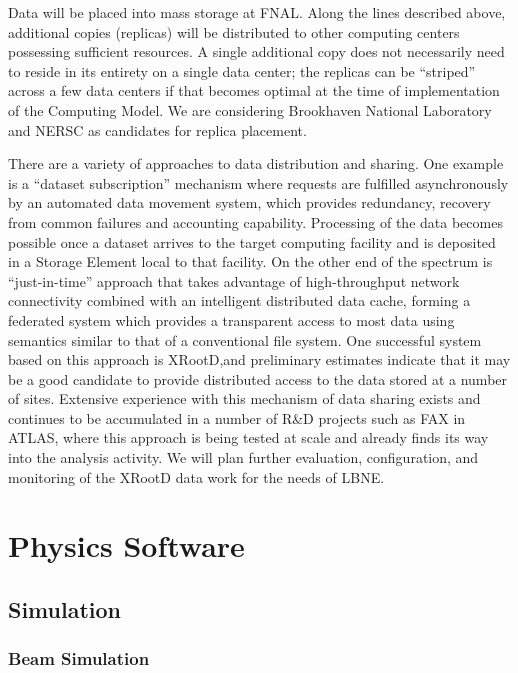 Data will be placed into mass storage at FNAL. Along the lines described above, additional copies (replicas) will be distributed to other
computing centers possessing sufficient resources.
A single additional copy does not necessarily need to reside in its entirety on a single data center; the replicas can be ``striped'' across a few data centers if that becomes optimal
at the time of implementation of the Computing Model. We are considering Brookhaven National Laboratory and NERSC as candidates for replica placement.

There are a variety of approaches to data distribution and sharing. One example is a ``dataset subscription''  mechanism where requests are fulfilled asynchronously by an automated data movement system, which provides redundancy, recovery from common failures and accounting capability. Processing of the data becomes possible once a dataset arrives to the target computing facility and is deposited in a Storage Element local to that facility.
On the other end of the spectrum is ``just-in-time'' approach that takes advantage of high-throughput network connectivity combined with an intelligent distributed data cache, forming a federated system which provides a 
transparent access to most data using semantics similar to that of a conventional file system. One successful system based on this approach is XRootD,and preliminary estimates indicate that it may be a good candidate to provide distributed access to the data stored at a number of sites. Extensive experience with this mechanism of data sharing exists and continues to be accumulated in a number of R\&D projects such as FAX in ATLAS, where this approach is being tested at scale and already finds its way into the analysis activity. We will plan further evaluation, configuration, and monitoring of the XRootD data work for the needs of LBNE.

\section{Physics Software}
\label{sec:detectors-sc-physics-software}

\subsection{Simulation}
\label{sec:detectors-sc-physics-software-simulation}

\subsubsection{Beam Simulation}
\label{sec:detectors-sc-physics-software-simulation-beam}

